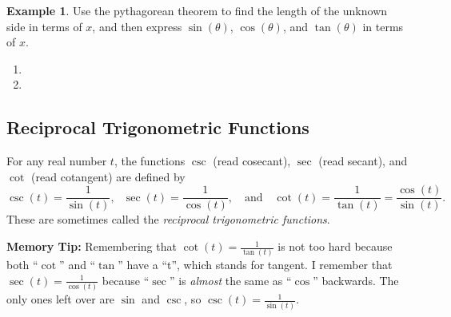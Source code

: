 \documentclass[letterpaper,12pt,oneside]{book}
\theoremstyle{definition}
\newtheorem{example}[theorem]{Example}
\begin{document}
{\begin{example}
Use the pythagorean theorem to find the length of the unknown side in terms of $x$, and then express $\sin(\theta)$, $\cos(\theta)$, and $\tan(\theta)$ in terms of $x$.
\begin{enumerate}
\item {}
\vfill
\item {}
\vfill
\end{enumerate}
\end{example}

\newpage

\subsection*{Reciprocal Trigonometric Functions}

For any real number $t$, the functions $\csc$ (read cosecant), $\sec$ (read secant), and $\cot$ (read cotangent) are defined by
\[
\csc(t)=\frac{1}{\sin(t)}, \ \ \ \sec(t)=\frac{1}{\cos(t)}, \ \ \ \mbox{ and } \ \ \ \cot(t)=\frac{1}{\tan(t)}=\frac{\cos(t)}{\sin(t)}.
\]
These are sometimes called the \emph{reciprocal trigonometric functions}.

\smallskip

\noindent
\textbf{Memory Tip:} Remembering that $\cot(t)=\frac{1}{\tan(t)}$ is not too hard because both ``$\cot$'' and ``$\tan$'' have a ``t'', which stands for tangent.  I remember that $\sec(t)=\frac{1}{\cos(t)}$ because ``$\sec$'' is \emph{almost} the same as ``$\cos$'' backwards.  The only ones left over are $\sin$ and $\csc$, so $\csc(t)=\frac{1}{\sin(t)}$.

}
\end{document}
